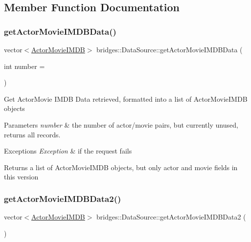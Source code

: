 \subsection{Member Function Documentation}
\mbox{\label{classbridges_1_1_data_source_a664694136550312ab3f5a82bebb91bca}} 
\subsubsection{\texorpdfstring{getActorMovieIMDBData()}{getActorMovieIMDBData()}}
{\footnotesize\ttfamily vector$<$\mbox{\hyperlink{classbridges_1_1dataset_1_1_actor_movie_i_m_d_b}{Actor\+Movie\+I\+M\+DB}}$>$ bridges\+::\+Data\+Source\+::get\+Actor\+Movie\+I\+M\+D\+B\+Data (\begin{DoxyParamCaption}\item[{int}]{number = {} }\end{DoxyParamCaption})\hspace{0.3cm}{\ttfamily [inline]}}

Get Actor\+Movie I\+M\+DB Data retrieved, formatted into a list of Actor\+Movie\+I\+M\+DB objects


\begin{DoxyParams}{Parameters}
{\em number} & the number of actor/movie pairs, but currently unused, returns all records. \\
\hline
\end{DoxyParams}

\begin{DoxyExceptions}{Exceptions}
{\em Exception} & if the request fails\\
\hline
\end{DoxyExceptions}
\begin{DoxyReturn}{Returns}
a list of Actor\+Movie\+I\+M\+DB objects, but only actor and movie fields in this version 
\end{DoxyReturn}
\mbox{\label{classbridges_1_1_data_source_a00f0a0a1871d4864c6ccdd04195e0fb2}} 
\subsubsection{\texorpdfstring{getActorMovieIMDBData2()}{getActorMovieIMDBData2()}}
{\footnotesize\ttfamily vector$<$\mbox{\hyperlink{classbridges_1_1dataset_1_1_actor_movie_i_m_d_b}{Actor\+Movie\+I\+M\+DB}}$>$ bridges\+::\+Data\+Source\+::get\+Actor\+Movie\+I\+M\+D\+B\+Data2 (\begin{DoxyParamCaption}{ }\end{DoxyParamCaption})\hspace{0.3cm}{\ttfamily [inline]}}

